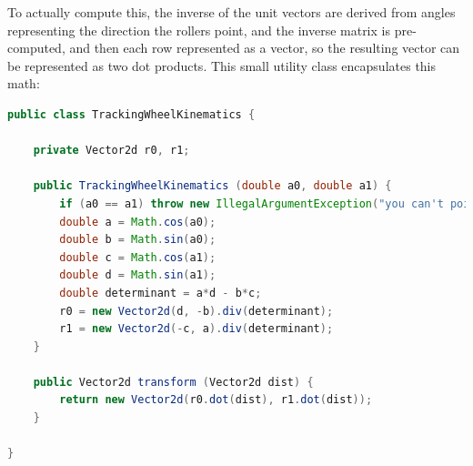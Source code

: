 \documentclass{article}
\begin{document}
To actually compute this, the inverse of the unit vectors are derived from angles representing the direction the rollers point, and the inverse matrix is pre-computed, and then each row represented as a vector, so the resulting vector can be represented as two dot products. This small utility class encapsulates this math:

\begin{lstlisting}[language=Java]
public class TrackingWheelKinematics {

    private Vector2d r0, r1;

    public TrackingWheelKinematics (double a0, double a1) {
        if (a0 == a1) throw new IllegalArgumentException("you can't point them in the same direction silly!!!");
        double a = Math.cos(a0);
        double b = Math.sin(a0);
        double c = Math.cos(a1);
        double d = Math.sin(a1);
        double determinant = a*d - b*c;
        r0 = new Vector2d(d, -b).div(determinant);
        r1 = new Vector2d(-c, a).div(determinant);
    }

    public Vector2d transform (Vector2d dist) {
        return new Vector2d(r0.dot(dist), r1.dot(dist));
    }

}
\end{lstlisting}
\end{document}
